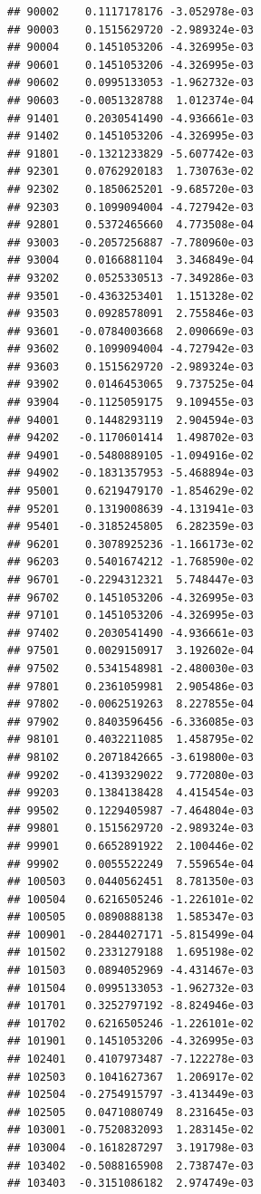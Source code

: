 \begin{frame}[fragile]
\begin{verbatim}
## 90002    0.1117178176 -3.052978e-03
## 90003    0.1515629720 -2.989324e-03
## 90004    0.1451053206 -4.326995e-03
## 90601    0.1451053206 -4.326995e-03
## 90602    0.0995133053 -1.962732e-03
## 90603   -0.0051328788  1.012374e-04
## 91401    0.2030541490 -4.936661e-03
## 91402    0.1451053206 -4.326995e-03
## 91801   -0.1321233829 -5.607742e-03
## 92301    0.0762920183  1.730763e-02
## 92302    0.1850625201 -9.685720e-03
## 92303    0.1099094004 -4.727942e-03
## 92801    0.5372465660  4.773508e-04
## 93003   -0.2057256887 -7.780960e-03
## 93004    0.0166881104  3.346849e-04
## 93202    0.0525330513 -7.349286e-03
## 93501   -0.4363253401  1.151328e-02
## 93503    0.0928578091  2.755846e-03
## 93601   -0.0784003668  2.090669e-03
## 93602    0.1099094004 -4.727942e-03
## 93603    0.1515629720 -2.989324e-03
## 93902    0.0146453065  9.737525e-04
## 93904   -0.1125059175  9.109455e-03
## 94001    0.1448293119  2.904594e-03
## 94202   -0.1170601414  1.498702e-03
## 94901   -0.5480889105 -1.094916e-02
## 94902   -0.1831357953 -5.468894e-03
## 95001    0.6219479170 -1.854629e-02
## 95201    0.1319008639 -4.131941e-03
## 95401   -0.3185245805  6.282359e-03
## 96201    0.3078925236 -1.166173e-02
## 96203    0.5401674212 -1.768590e-02
## 96701   -0.2294312321  5.748447e-03
## 96702    0.1451053206 -4.326995e-03
## 97101    0.1451053206 -4.326995e-03
## 97402    0.2030541490 -4.936661e-03
## 97501    0.0029150917  3.192602e-04
## 97502    0.5341548981 -2.480030e-03
## 97801    0.2361059981  2.905486e-03
## 97802   -0.0062519263  8.227855e-04
## 97902    0.8403596456 -6.336085e-03
## 98101    0.4032211085  1.458795e-02
## 98102    0.2071842665 -3.619800e-03
## 99202   -0.4139329022  9.772080e-03
## 99203    0.1384138428  4.415454e-03
## 99502    0.1229405987 -7.464804e-03
## 99801    0.1515629720 -2.989324e-03
## 99901    0.6652891922  2.100446e-02
## 99902    0.0055522249  7.559654e-04
## 100503   0.0440562451  8.781350e-03
## 100504   0.6216505246 -1.226101e-02
## 100505   0.0890888138  1.585347e-03
## 100901  -0.2844027171 -5.815499e-04
## 101502   0.2331279188  1.695198e-02
## 101503   0.0894052969 -4.431467e-03
## 101504   0.0995133053 -1.962732e-03
## 101701   0.3252797192 -8.824946e-03
## 101702   0.6216505246 -1.226101e-02
## 101901   0.1451053206 -4.326995e-03
## 102401   0.4107973487 -7.122278e-03
## 102503   0.1041627367  1.206917e-02
## 102504  -0.2754915797 -3.413449e-03
## 102505   0.0471080749  8.231645e-03
## 103001  -0.7520832093  1.283145e-02
## 103004  -0.1618287297  3.191798e-03
## 103402  -0.5088165908  2.738747e-03
## 103403  -0.3151086182  2.974749e-03

\end{verbatim}
\end{frame}
